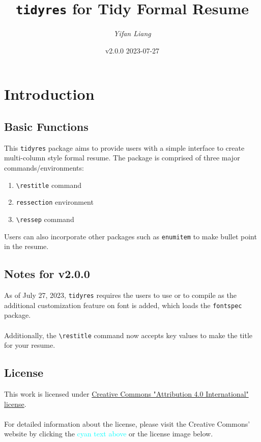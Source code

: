 \documentclass[a4paper,10pt]{article}
\title{{\tt tidyres} for Tidy Formal Resume}
\author{\itshape Yifan Liang}
\date{v2.0.0 2023-07-27}
\begin{document}
\maketitle
\tableofcontents
\thispagestyle{empty}

\newpage
\setcounter{page}{1}
\pagestyle{plain}

\section{Introduction}
\subsection{Basic Functions}
This {\tt tidyres} package aims to provide users with a simple interface to create multi-column style formal resume. The package is comprised of three major commands/environments:

\begin{enumerate}[label=\textbullet,leftmargin=6ex,topsep=4ex]
    \item \verb+\restitle+ command
    \item \verb+ressection+ environment
    \item \verb+\ressep+ command
\end{enumerate}

Users can also incorporate other packages such as \verb+enumitem+ to make bullet point in the resume.

\subsection{Notes for v2.0.0}
As of July 27, 2023, {\tt tidyres} requires the users to use  or  to compile as the additional customization feature on font is added, which loads the {\tt fontspec} package.\\
\\
Additionally, the \verb+\restitle+ command now accepts key values to make the title for your resume.

\subsection{License}
This work is licensed under \href{https://creativecommons.org/licenses/by/4.0/}{Creative Commons "Attribution 4.0 International" license}.\\
\\
For detailed information about the license, please visit the Creative Commons' website by clicking the \textcolor{Cyan}{cyan text above} or the license image below.
\\
\begin{flushright}
    \doclicenseImage
\end{flushright}
\end{document}

